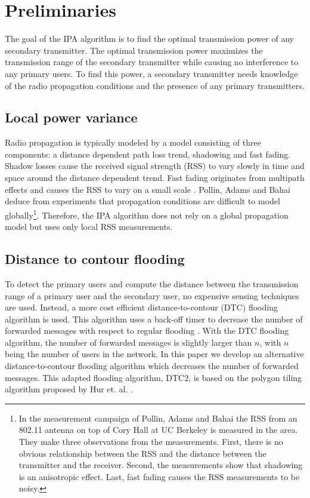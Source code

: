 \section{Preliminaries}\label{sec:pre}

The goal of the IPA algorithm is to find the optimal transmission power of any secondary transmitter. The optimal transmission power maximizes the transmission range of the secondary transmitter while causing no interference to any primary users. To find this power, a secondary transmitter needs knowledge of the radio propagation conditions and the presence of any primary transmitters. 
\subsection{Local power variance}

Radio propagation is typically modeled by a model consisting of three components: a distance dependent path loss trend, shadowing and fast fading. Shadow losses cause the received signal strength (RSS) to vary slowly in time and space around the distance dependent trend. Fast fading originates from multipath effects and causes the RSS to vary on a small scale \cite{bookPathlossModel}. Pollin, Adams and Bahai deduce from experiments that propagation conditions are difficult to model globally\footnote{In the measurement campaign of Pollin, Adams and Bahai \cite{sofie} the RSS from an 802.11 antenna on top of Cory Hall at UC Berkeley is measured in the area. They make three observations from the measurements. First, there is no obvious relationship between the RSS and the distance between the transmitter and the receiver. Second, the measurements show that shadowing is an anisotropic effect. Last, fast fading causes the RSS measurements to be noisy.}\cite{sofie}. Therefore, the IPA algorithm does not rely on a global propagation model but uses only local RSS measurements.

\subsection{Distance to contour flooding}
To detect the primary users and compute the distance between the transmission range of a primary user and the secondary user, no expensive sensing techniques are used. Instead, a more cost efficient distance-to-contour (DTC) flooding algorithm is used. This algorithm uses a back-off timer to decrease the number of forwarded messages with respect to regular flooding \cite{dtc}. With the DTC flooding algorithm, the number of forwarded messages is slightly larger than $n$, with $n$ being the number of users in the network. In this paper we develop an alternative distance-to-contour flooding algorithm which decreases the number of forwarded messages. This adapted flooding algorithm, DTC2, is based on the polygon tiling algorithm proposed by Hur et. al. \cite{dtc2}.

